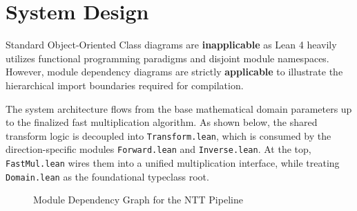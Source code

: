 \documentclass[a4paper,12pt]{report}
\begin{document}
\section{System Design}
Standard Object-Oriented Class diagrams are \textbf{inapplicable} as Lean 4 heavily utilizes functional programming paradigms and disjoint module namespaces. However, module dependency diagrams are strictly \textbf{applicable} to illustrate the hierarchical import boundaries required for compilation. 

The system architecture flows from the base mathematical domain parameters up to the finalized fast multiplication algorithm. As shown below, the shared transform logic is decoupled into \texttt{Transform.lean}, which is consumed by the direction-specific modules \texttt{Forward.lean} and \texttt{Inverse.lean}. At the top, \texttt{FastMul.lean} wires them into a unified multiplication interface, while treating \texttt{Domain.lean} as the foundational typeclass root.

\begin{figure}[h]
    \centering
    \caption{Module Dependency Graph for the NTT Pipeline}
    \label{fig:module_dependencies}
\end{figure}
\end{document}

